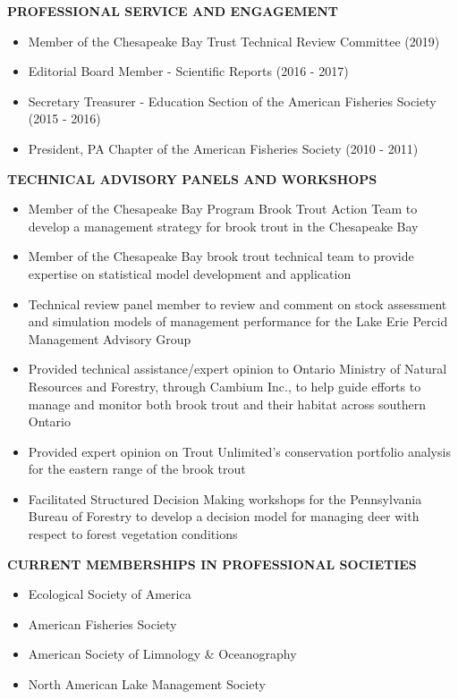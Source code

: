 \documentclass[10pt]{article}
\begin{document}
\centerline {\bf{PROFESSIONAL SERVICE AND ENGAGEMENT}}
\vspace{5pt}
\begin{itemize}
\item Member of the Chesapeake Bay Trust Technical Review Committee (2019)
\item Editorial Board Member - Scientific Reports (2016 - 2017)
\item Secretary Treasurer - Education Section of the American Fisheries Society (2015 - 2016)
\item President, PA Chapter of the American Fisheries Society (2010 - 2011)
\end{itemize}

\centerline {\bf{TECHNICAL ADVISORY PANELS AND WORKSHOPS}}
\vspace{5pt}
\begin{itemize}
\item Member of the Chesapeake Bay Program Brook Trout Action Team to develop a management strategy for brook trout in the Chesapeake Bay
\item Member of the Chesapeake Bay brook trout technical team to provide expertise on statistical model development and application
\item Technical review panel member to review and comment on stock assessment and simulation models of management performance for the Lake Erie Percid Management Advisory Group
\item Provided technical assistance/expert opinion to Ontario Ministry of Natural Resources and Forestry, through Cambium Inc., to help guide efforts to manage and monitor both brook trout and their habitat across southern Ontario
\item Provided expert opinion on Trout Unlimited's conservation portfolio analysis for the eastern range of the brook trout
\item Facilitated Structured Decision Making workshops for the Pennsylvania Bureau of Forestry to develop a decision model for managing deer with respect to forest vegetation conditions
\end{itemize}

\centerline {\bf{CURRENT MEMBERSHIPS IN PROFESSIONAL SOCIETIES}}
\vspace{5pt}
\begin{itemize}
\item Ecological Society of America
\item American Fisheries Society
\item American Society of Limnology \& Oceanography
\item North American Lake Management Society
\end{itemize}
\end{document}

